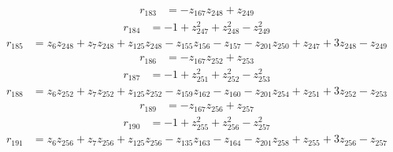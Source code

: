\begin{align*}
r_{183} &= -z_{167}z_{248} + z_{249}
\end{align*}
\begin{align*}
r_{184} &= -1 + z_{247}^{2} + z_{248}^{2} - z_{249}^{2}
\end{align*}
\begin{align*}
r_{185} &= z_{6}z_{248} + z_{7}z_{248} + z_{125}z_{248} - z_{155}z_{156} - z_{157} - z_{201}z_{250} + z_{247} + 3z_{248} - z_{249}
\end{align*}
\begin{align*}
r_{186} &= -z_{167}z_{252} + z_{253}
\end{align*}
\begin{align*}
r_{187} &= -1 + z_{251}^{2} + z_{252}^{2} - z_{253}^{2}
\end{align*}
\begin{align*}
r_{188} &= z_{6}z_{252} + z_{7}z_{252} + z_{125}z_{252} - z_{159}z_{162} - z_{160} - z_{201}z_{254} + z_{251} + 3z_{252} - z_{253}
\end{align*}
\begin{align*}
r_{189} &= -z_{167}z_{256} + z_{257}
\end{align*}
\begin{align*}
r_{190} &= -1 + z_{255}^{2} + z_{256}^{2} - z_{257}^{2}
\end{align*}
\begin{align*}
r_{191} &= z_{6}z_{256} + z_{7}z_{256} + z_{125}z_{256} - z_{135}z_{163} - z_{164} - z_{201}z_{258} + z_{255} + 3z_{256} - z_{257}
\end{align*}
